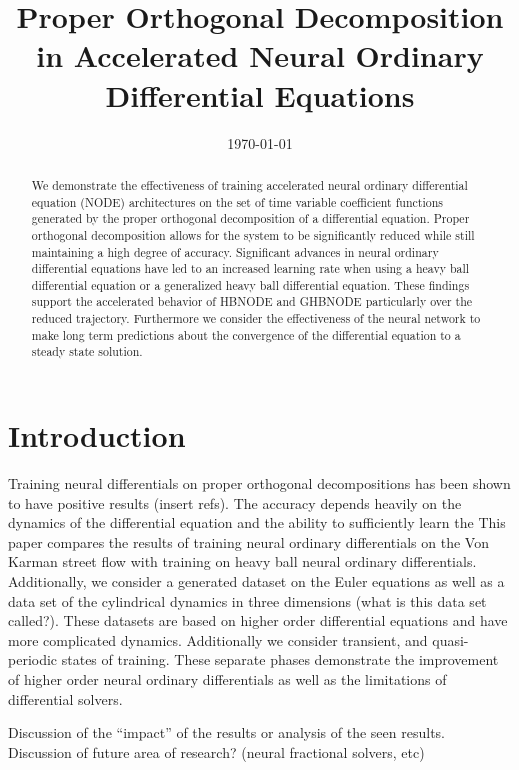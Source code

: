 \documentclass[]{type}
\title{Proper Orthogonal Decomposition in Accelerated Neural Ordinary Differential Equations}
\date{\today}
\begin{document}
\maketitle

\begin{abstract}

	We demonstrate the effectiveness of training accelerated neural ordinary differential equation (NODE) architectures
	on the set of time variable coefficient functions generated by the proper orthogonal decomposition
	of a differential equation. %
	Proper orthogonal decomposition allows for the system to be significantly reduced while still maintaining
	a high degree of accuracy.
	Significant advances in neural ordinary differential equations have led to an increased
	learning rate when using a heavy ball differential equation or a generalized heavy ball differential equation.
	These findings support the accelerated behavior of HBNODE and GHBNODE particularly over the reduced trajectory.
	Furthermore we consider the effectiveness of the neural network to make long term predictions about the
	convergence of the differential equation to a steady state solution.

\end{abstract}

\section{Introduction}

Training neural differentials on proper orthogonal decompositions has been shown to have positive results
(insert refs).
The accuracy depends heavily on the dynamics of the differential equation and the ability to sufficiently
learn the 
This paper compares the results of training neural ordinary differentials on the Von Karman street flow
with training on heavy ball neural ordinary differentials.
Additionally, we consider a generated dataset on the Euler equations as well as a data set of the
cylindrical dynamics in three dimensions (what is this data set called?).
These datasets are based on higher order differential equations and have more complicated dynamics.
Additionally we consider transient, and quasi-periodic states of training.
These separate phases demonstrate the improvement of higher order neural ordinary differentials
as well as the limitations of differential solvers.

Discussion of the ``impact'' of the results or analysis of the seen results.
Discussion of future area of research? (neural fractional solvers, etc)
\end{document}

